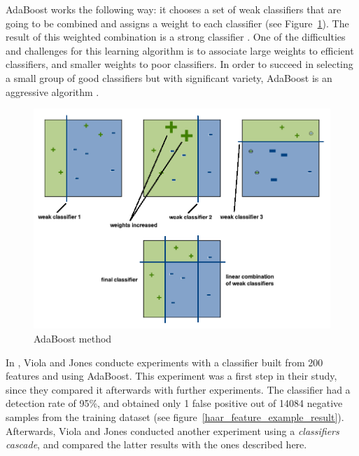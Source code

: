 \noindent AdaBoost works the following way: it chooses a set of weak classifiers that are going to be combined and assigns a weight to each classifier (see Figure~\ref{haar_feature_adaboost}). The result of this weighted combination is a strong classifier \cite{HEW07}. One of the difficulties and challenges for this learning algorithm is to associate large weights to efficient classifiers, and smaller weights to poor classifiers. In order to succeed in selecting a small group of good classifiers but with significant variety, AdaBoost is an aggressive algorithm \cite{VIO01}.
\newline

\begin{figure}[!h]
\begin{center}
\noindent \includegraphics[scale=0.4]{figures/haar_feature_adaboost} 
\newline
\caption{AdaBoost method}
\label{haar_feature_adaboost}
\end{center} 
\end{figure}

\noindent In \cite{VIO01}, Viola and Jones conducte experiments with a classifier built from 200 features and using AdaBoost. This experiment was a first step in their study, since they compared it afterwards with further experiments. The classifier had a detection rate of 95\%, and obtained only 1 false positive out of 14084 negative samples from the training dataset (see figure~\ref{haar_feature_example_result}). Afterwards, Viola and Jones conducted another experiment using a \textit{classifiers cascade}, and compared the latter results with the ones described here.
\newline

